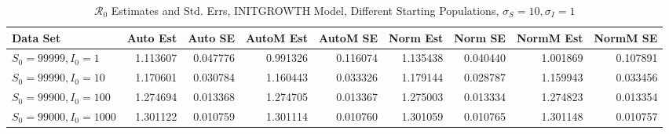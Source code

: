\documentclass[12pt]{article}
\newcommand{\rr}{\ensuremath{\mathcal{R}_0}}
\begin{document}
\begin{table}[H]
	
	\caption{$\rr$ Estimates and Std. Errs, INITGROWTH Model,
		Different Starting Populations, 
		$\sigma_S = 10, \sigma_I = 1$}
	\begin{footnotesize}
		\hskip -1.7cm
	\begin{tabular}{l|r|r|r|r|r|r|r|r}
		\hline
		Data Set & Auto Est & Auto SE & AutoM Est & AutoM SE & Norm Est & Norm SE & NormM Est & NormM SE\\
		\hline
		$S_0 = 99999, I_0 = 1$ & 1.113607 & 0.047776 & 0.991326 & 0.116074 & 1.135438 & 0.040440 & 1.001869 & 0.107891\\
		\hline
		$S_0 = 99990, I_0 = 10$ & 1.170601 & 0.030784 & 1.160443 & 0.033326 & 1.179144 & 0.028787 & 1.159943 & 0.033456\\
		\hline
		$S_0 = 99900, I_0 = 100$ & 1.274694 & 0.013368 & 1.274705 & 0.013367 & 1.275003 & 0.013334 & 1.274823 & 0.013354\\
		\hline
		$S_0 = 99000, I_0 = 1000$ & 1.301122 & 0.010759 & 1.301114 & 0.010760 & 1.301059 & 0.010765 & 1.301148 & 0.010757\\
		\hline
	\end{tabular}
\end{footnotesize}
\end{table}
\end{document}
